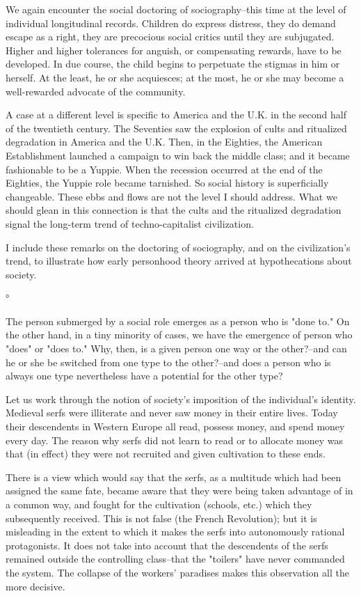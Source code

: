 \begin{enumerate}[label=\alph*.]
We again encounter the social doctoring of sociography–this time at the level of individual longitudinal records. Children do express distress, they do demand escape as a right, they are precocious social critics until they are subjugated. Higher and higher tolerances for anguish, or compensating rewards, have to be developed. In due course, the child begins to perpetuate the stigmas in him or herself. At the least, he or she acquiesces; at the most, he or she may become a well-rewarded advocate of the community.

A case at a different level is specific to America and the U.K. in the second half of the twentieth century. The Seventies saw the explosion of cults and ritualized degradation in America and the U.K. Then, in the Eighties, the American Establishment launched a campaign to win back the middle class; and it became fashionable to be a Yuppie. When the recession occurred at the end of the Eighties, the Yuppie role became tarnished. So social history is superficially changeable. These ebbs and flows are not the level I should address. What we should glean in this connection is that the cults and the ritualized degradation signal the long-term trend of techno-capitalist civilization.

I include these remarks on the doctoring of sociography, and on the civilization’s trend, to illustrate how early personhood theory arrived at hypothecations about society.

°

The person submerged by a social role emerges as a person who is "done to." On the other hand, in a tiny minority of cases, we have the emergence of person who "does" or "does to." Why, then, is a given person one way or the other?–and can he or she be switched from one type to the other?–and does a person who is always one type nevertheless have a potential for the other type?

Let us work through the notion of society’s imposition of the individual’s identity. Medieval serfs were illiterate and never saw money in their entire lives. Today their descendents in Western Europe all read, possess money, and spend money every day. The reason why serfs did not learn to read or to allocate money was that (in effect) they were not recruited and given cultivation to these ends.

There is a view which would say that the serfs, as a multitude which had been assigned the same fate, became aware that they were being taken advantage of in a common way, and fought for the cultivation (schools, etc.) which they subsequently received. This is not false (the French Revolution); but it is misleading in the extent to which it makes the serfs into autonomously rational protagonists. It does not take into account that the descendents of the serfs remained outside the controlling class–that the "toilers" have never commanded the system. The collapse of the workers' paradises makes this observation all the more decisive.


\end{enumerate}
